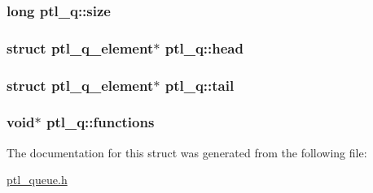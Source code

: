 \hypertarget{structptl__q_3f0431c19a769ad9b217fd4346be9d7a}{
\subsubsection{\setlength{\rightskip}{0pt plus 5cm}long {\bf ptl\_\-q::size}}}
\label{structptl__q_3f0431c19a769ad9b217fd4346be9d7a}


\hypertarget{structptl__q_621b56b8f7c05e525fd57d9df6e4da98}{
\subsubsection{\setlength{\rightskip}{0pt plus 5cm}struct {\bf ptl\_\-q\_\-element}$\ast$ {\bf ptl\_\-q::head}}}
\label{structptl__q_621b56b8f7c05e525fd57d9df6e4da98}


\hypertarget{structptl__q_1e1123cd870ec27fa4bfd60b1bee30da}{
\subsubsection{\setlength{\rightskip}{0pt plus 5cm}struct {\bf ptl\_\-q\_\-element}$\ast$ {\bf ptl\_\-q::tail}}}
\label{structptl__q_1e1123cd870ec27fa4bfd60b1bee30da}


\hypertarget{structptl__q_220328a94e311f641635b33ac2d9bfca}{
\subsubsection{\setlength{\rightskip}{0pt plus 5cm}void$\ast$ {\bf ptl\_\-q::functions}}}
\label{structptl__q_220328a94e311f641635b33ac2d9bfca}




The documentation for this struct was generated from the following file:\begin{CompactItemize}
\item 
\hyperlink{ptl__queue_8h}{ptl\_\-queue.h}\end{CompactItemize}
